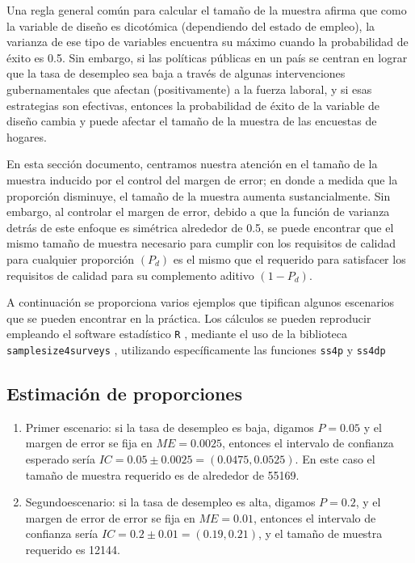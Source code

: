 \documentclass[
  12pt,
  spanish,
]{book}
\begin{document}
Una regla general común para calcular el tamaño de la muestra afirma que como la variable de diseño es dicotómica (dependiendo del estado de empleo), la varianza de ese tipo de variables encuentra su máximo cuando la probabilidad de éxito es 0.5. Sin embargo, si las políticas públicas en un país se centran en lograr que la tasa de desempleo sea baja a través de algunas intervenciones gubernamentales que afectan (positivamente) a la fuerza laboral, y si esas estrategias son efectivas, entonces la probabilidad de éxito de la variable de diseño cambia y puede afectar el tamaño de la muestra de las encuestas de hogares.

En esta sección documento, centramos nuestra atención en el tamaño de la muestra inducido por el control del margen de error; en donde a medida que la proporción disminuye, el tamaño de la muestra aumenta sustancialmente. Sin embargo, al controlar el margen de error, debido a que la función de varianza detrás de este enfoque es simétrica alrededor de 0.5, se puede encontrar que el mismo tamaño de muestra necesario para cumplir con los requisitos de calidad para cualquier proporción \((P_d)\) es el mismo que el requerido para satisfacer los requisitos de calidad para su complemento aditivo \((1 - P_d)\).

A continuación se proporciona varios ejemplos que tipifican algunos escenarios que se pueden encontrar en la práctica. Los cálculos se pueden reproducir empleando el software estadístico \texttt{R} \citep{R2020}, mediante el uso de la biblioteca \texttt{samplesize4surveys} \citep{ss4s}, utilizando específicamente las funciones \texttt{ss4p} y \texttt{ss4dp}

\hypertarget{estimaciuxf3n-de-proporciones}{%
\subsection{Estimación de proporciones}\label{estimaciuxf3n-de-proporciones}}

\begin{enumerate}
\def\labelenumi{\arabic{enumi}.}
\item
  Primer escenario: si la tasa de desempleo es baja, digamos \({P}=0.05\) y el margen de error se fija en \(ME = 0.0025\), entonces el intervalo de confianza esperado sería \(IC=0.05\pm0.0025=(0.0475,0.0525)\). En este caso el tamaño de muestra requerido es de alrededor de 55169.
\item
  Segundoescenario: si la tasa de desempleo es alta, digamos \({P}=0.2\), y el margen de error de error se fija en \(ME = 0.01\), entonces el intervalo de confianza sería \(IC=0.2\pm0.01=(0.19,0.21)\), y el tamaño de muestra requerido es 12144.
\end{enumerate}
\end{document}
